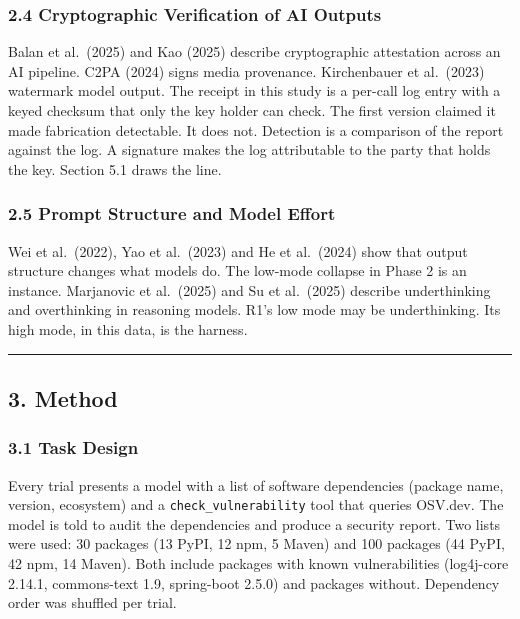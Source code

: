 \documentclass[
]{article}
\begin{document}
\subsubsection{2.4 Cryptographic Verification of AI
Outputs}\label{cryptographic-verification-of-ai-outputs}

Balan et al.~(2025) and Kao (2025) describe cryptographic attestation
across an AI pipeline. C2PA (2024) signs media provenance. Kirchenbauer
et al.~(2023) watermark model output. The receipt in this study is a
per-call log entry with a keyed checksum that only the key holder can
check. The first version claimed it made fabrication detectable. It does
not. Detection is a comparison of the report against the log. A
signature makes the log attributable to the party that holds the key.
Section 5.1 draws the line.

\subsubsection{2.5 Prompt Structure and Model
Effort}\label{prompt-structure-and-model-effort}

Wei et al.~(2022), Yao et al.~(2023) and He et al.~(2024) show that
output structure changes what models do. The low-mode collapse in Phase
2 is an instance. Marjanovic et al.~(2025) and Su et al.~(2025) describe
underthinking and overthinking in reasoning models. R1's low mode may be
underthinking. Its high mode, in this data, is the harness.

\begin{center}\rule{0.5\linewidth}{0.5pt}\end{center}

\subsection{3. Method}\label{method}

\subsubsection{3.1 Task Design}\label{task-design}

Every trial presents a model with a list of software dependencies
(package name, version, ecosystem) and a \texttt{check\_vulnerability}
tool that queries OSV.dev. The model is told to audit the dependencies
and produce a security report. Two lists were used: 30 packages (13
PyPI, 12 npm, 5 Maven) and 100 packages (44 PyPI, 42 npm, 14 Maven).
Both include packages with known vulnerabilities (log4j-core 2.14.1,
commons-text 1.9, spring-boot 2.5.0) and packages without. Dependency
order was shuffled per trial.
\end{document}
